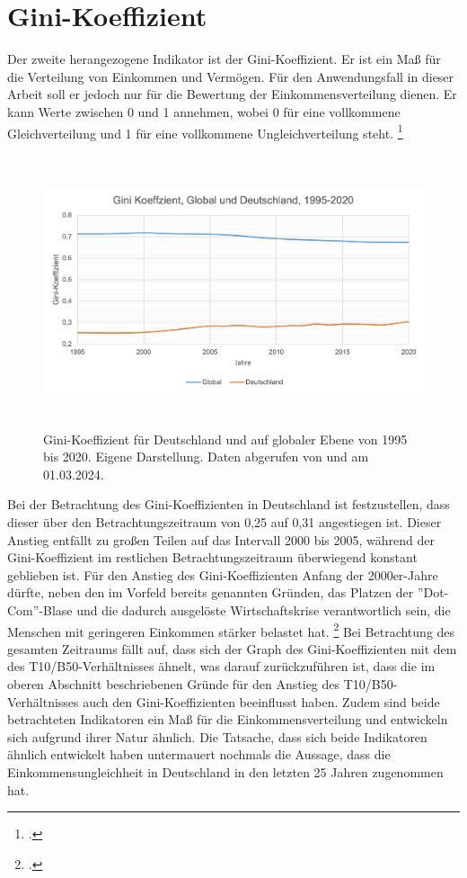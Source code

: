 \section{Gini-Koeffizient}

Der zweite herangezogene Indikator ist der Gini-Koeffizient. Er ist ein Ma{\ss} für die Verteilung von Einkommen und Vermögen. Für den Anwendungsfall in dieser Arbeit soll er jedoch nur für die Bewertung der Einkommensverteilung dienen. Er kann Werte zwischen 0 und 1 annehmen, wobei 0 für eine vollkommene Gleichverteilung und 1 für eine vollkommene Ungleichverteilung steht. \footcite[Vgl.][]{gini_definition_diw_2024}

\begin{figure}[h]
    \centering
    \includegraphics[height=8cm]{Bilder/Gini-Koeffizient2.png}
    \caption[Gini-Koeffizient, Deutschland und global, 1995-2020]{Gini-Koeffizient für Deutschland und auf globaler Ebene von 1995 bis 2020. Eigene Darstellung. Daten abgerufen von \cite[][, S.56 (global)]{wir_2022} und \cite[][(Deutschland)]{bmas_arb_gini_2020} am 01.03.2024.}
    \label{fig:iso_norm}
\end{figure}

Bei der Betrachtung des Gini-Koeffizienten in Deutschland ist festzustellen, dass dieser über den Betrachtungszeitraum von 0,25 auf 0,31 angestiegen ist. Dieser Anstieg entfällt zu gro{\ss}en Teilen auf das Intervall 2000 bis 2005, während der Gini-Koeffizient im restlichen Betrachtungszeitraum überwiegend konstant geblieben ist. Für den Anstieg des Gini-Koeffizienten Anfang der 2000er-Jahre dürfte, neben den im Vorfeld bereits genannten Gründen, das Platzen der ''Dot-Com''-Blase und die dadurch ausgelöste Wirtschaftskrise verantwortlich sein, die Menschen mit geringeren Einkommen stärker belastet hat. \footcite[Vgl. ][S. 3]{horn_wirtschaftskrise_2014} Bei Betrachtung des gesamten Zeitraums fällt auf, dass sich der Graph des Gini-Koeffizienten mit dem des T10/B50-Verhältnisses ähnelt, was darauf zurückzuführen ist, dass die im oberen Abschnitt beschriebenen Gründe für den Anstieg des T10/B50-Verhältnisses auch den Gini-Koeffizienten beeinflusst haben. Zudem sind beide betrachteten Indikatoren ein Ma{\ss} für die Einkommensverteilung und entwickeln sich aufgrund ihrer Natur ähnlich. Die Tatsache, dass sich beide Indikatoren ähnlich entwickelt haben untermauert nochmals die Aussage, dass die Einkommensungleichheit in Deutschland in den letzten 25 Jahren zugenommen hat.

